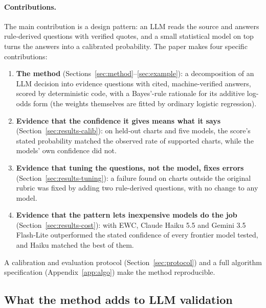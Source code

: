 \documentclass[10pt,letterpaper]{article}
\begin{document}
\paragraph{Contributions.} The main contribution is a design pattern: an LLM reads the source and answers rule-derived questions with verified quotes, and a small statistical model on top turns the answers into a calibrated probability. The paper makes four specific contributions:
\begin{enumerate}
  \item \textbf{The method} (Sections~\ref{sec:method}--\ref{sec:example}): a decomposition of an LLM decision into evidence questions with cited, machine-verified answers, scored by deterministic code, with a Bayes'-rule rationale for its additive log-odds form (the weights themselves are fitted by ordinary logistic regression).
  \item \textbf{Evidence that the confidence it gives means what it says} (Section~\ref{sec:results-calib}): on held-out charts and five models, the score's stated probability matched the observed rate of supported charts, while the models' own confidence did not.
  \item \textbf{Evidence that tuning the questions, not the model, fixes errors} (Section~\ref{sec:results-tuning}): a failure found on charts outside the original rubric was fixed by adding two rule-derived questions, with no change to any model.
  \item \textbf{Evidence that the pattern lets inexpensive models do the job} (Section~\ref{sec:results-cost}): with EWC, Claude Haiku 5.5 and Gemini 3.5 Flash-Lite outperformed the stated confidence of every frontier model tested, and Haiku matched the best of them.
\end{enumerate}
A calibration and evaluation protocol (Section~\ref{sec:protocol}) and a full algorithm specification (Appendix~\ref{app:algo}) make the method reproducible.

\FloatBarrier
\subsection{What the method adds to LLM validation}\label{sec:adds}
\end{document}
